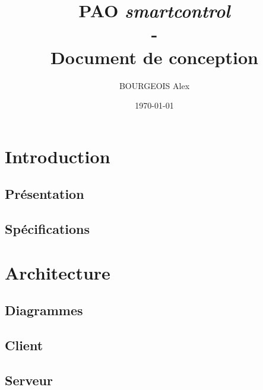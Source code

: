 \documentclass[a4paper,12pt]{report}
\title{\textbf{PAO \textit{smartcontrol}}\\-\\Document de conception}
\author{BOURGEOIS Alex}
\date \today
\begin{document}
\maketitle

\chapter{Introduction}

\section{Présentation}

\section{Spécifications}

\newpage

\chapter{Architecture}

\section{Diagrammes}

\newpage
\section{Client}

\newpage
\section{Serveur}

\end{document}
